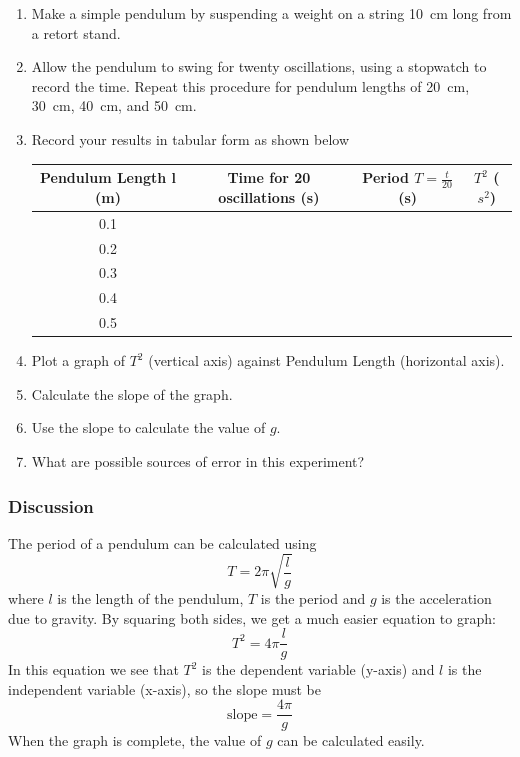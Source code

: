 \begin{enumerate}
\item{Make a simple pendulum by suspending a weight on a string 10~cm long from a retort
stand.}
\item{Allow the pendulum to swing for twenty oscillations, using a stopwatch to record the
time. Repeat this procedure for pendulum lengths of 20~cm, 30~cm, 40~cm, and 50~cm.}
\item{Record your results in tabular form as shown below}

\begin{center}
\begin{tabular}{ | c | c | c | c | }
\hline
Pendulum Length l (m) & Time for 20 oscillations (s) & Period $T = \frac{t}{20}$ (s) & $T^2$ ($s^2$) \\ \hline
0.1 & & & \\ \hline
0.2 & & & \\ \hline
0.3 & & & \\ \hline
0.4 & & & \\ \hline
0.5 & & & \\ \hline
\end{tabular}
\end{center}

\item{Plot a graph of $T^2$ (vertical axis) against Pendulum Length (horizontal axis).}
\item{Calculate the slope of the graph.}
\item{Use the slope to calculate the value of $g$.}
\item{What are possible sources of error in this experiment?}

\end{enumerate}

\subsubsection{Discussion}

The period of a pendulum can be calculated using $$T = 2\pi\sqrt{\frac{l}{g}}$$
where $l$ is the length of the pendulum, $T$ is the period and $g$ is the acceleration due to
gravity. By squaring both sides, we get a much easier equation to graph: $$T^2 = 4\pi\frac{l}{g}$$ In this equation we see that $T^2$ is the dependent variable (y-axis) and $l$ is the
independent variable (x-axis), so the slope must be $$\mathrm{slope} = \frac{4\pi}{g}$$ 
When the graph is complete, the value of $g$ can be calculated easily.

